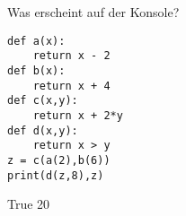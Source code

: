 \question[4] Was erscheint auf der Konsole?  
\begin{lstlisting}
def a(x):
    return x - 2
def b(x):
    return x + 4
def c(x,y):
    return x + 2*y
def d(x,y):
    return x > y
z = c(a(2),b(6))
print(d(z,8),z)
\end{lstlisting}
\begin{solutionbox}{1cm}
True 20
\end{solutionbox}
